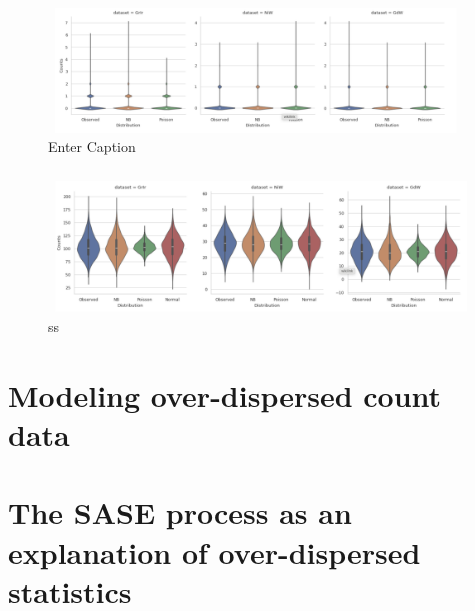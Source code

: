 \begin{figure}[t]
    \centering
    \includegraphics[width=1\linewidth]{images/violin_plots_per_pulse.png}
    \caption{Enter Caption}
\end{figure}

\begin{figure}[htbp]
    \centering
    \includegraphics[width=1\linewidth]{images/violinplots_per_train.png}
    \caption{ss}
    \label{s}   
\end{figure}
\section{Modeling over-dispersed count data}

\section{The SASE process as an explanation of over-dispersed statistics}
